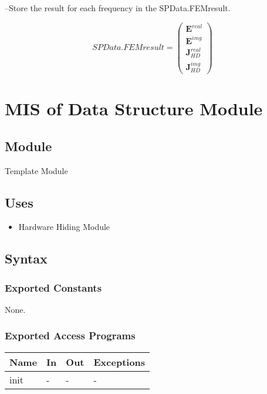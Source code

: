 \documentclass[12pt, titlepage]{article}
\begin{document}
\begin{itemize}
		
		\subitem --Store the result for each frequency in the SPData.FEMresult.
		
		\begin{equation*} SPData.FEMresult = \begin{pmatrix} \textbf{E}^{real}\\
				\textbf{E}^{img}\\ \textbf{J}^{real}_{HD}\\ \textbf{J}^{img}_{HD}
		\end{pmatrix} \end{equation*}
		
	\end{itemize}
	
	\newpage %
	\section{MIS of Data Structure Module} \label{DSM}
	
	\subsection{Module} Template Module
	
	\subsection{Uses} \begin{itemize} \item Hardware Hiding Module \end{itemize}
	
	\subsection{Syntax}
	
	\subsubsection{Exported Constants} None. \subsubsection{Exported Access
		Programs}
	
	\begin{center} \begin{tabular}{p{2cm} p{4cm} p{4cm} p{2cm}} \hline
			\textbf{Name} & \textbf{In} & \textbf{Out} & \textbf{Exceptions} \\ \hline init
			& - & - & - \\ \hline \end{tabular} \end{center}
	
\end{document}
